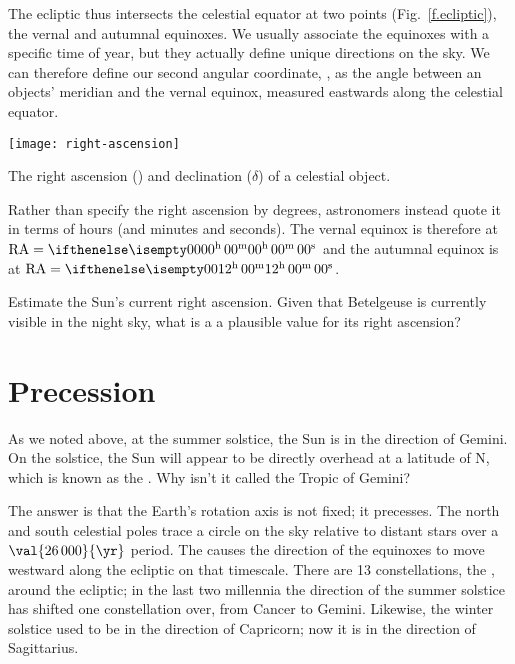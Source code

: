 The ecliptic thus intersects the celestial equator at two points (Fig.~\ref{f.ecliptic}), the vernal and autumnal equinoxes. We usually associate the equinoxes with a specific time of year, but they actually define unique directions on the sky. We can therefore define our second angular coordinate, , as the angle between an objects' meridian and the vernal equinox, measured eastwards along the celestial equator.

\begin{marginfigure}
\texttt{[image: right-ascension]}
\caption[Right ascension and declination]{The right ascension (\RA) and declination ($\delta$) of a celestial object.}
\label{f.right-ascension}
\end{marginfigure}

Rather than specify the right ascension by degrees, astronomers instead quote it in terms of hours (and minutes and seconds).  The vernal equinox is therefore at $\RA = \hrangle{00}{00}{00}$ and the autumnal equinox is at $\RA = \hrangle{12}{00}{00}$.

\begin{exercisebox}
Estimate the Sun's current right ascension.  Given that Betelgeuse is currently visible in the night sky, what is a a plausible value for its right ascension?
\label{ex.RA-sun}
\end{exercisebox}

\section{Precession}
As we noted above, at the summer solstice, the Sun is in the direction of Gemini. On the solstice, the Sun will appear to be directly overhead at a latitude of N, which is known as the .  Why isn't it called the Tropic of Gemini?

The answer is that the Earth's rotation axis is not fixed; it precesses. The north and south celestial poles trace a circle on the sky relative to distant stars over a $\val{26\,000}{\yr}$ period. The causes the direction of the equinoxes to move westward along the ecliptic on that timescale. There are 13 constellations, the , around the ecliptic; in the last two millennia the direction of the summer solstice has shifted one constellation over, from Cancer to Gemini. Likewise, the winter solstice used to be in the direction of Capricorn; now it is in the direction of Sagittarius.

